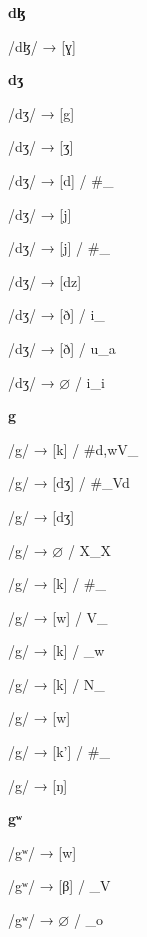 \begin{center}\textbf{dɮ}\end{center}
\begin{multicols}{4}
\noindent /dɮ/ → [ɣ]

\end{multicols}

\begin{center}\textbf{dʒ}\end{center}
\begin{multicols}{4}
\noindent /dʒ/ → [g]

\noindent /dʒ/ → [ʒ]

\noindent /dʒ/ → [d] / \#\_

\noindent /dʒ/ → [j]

\noindent /dʒ/ → [j] / \#\_

\noindent /dʒ/ → [dz]

\noindent /dʒ/ → [ð] / i\_

\noindent /dʒ/ → [ð] / u\_a

\noindent /dʒ/ → $\varnothing$ / i\_i

\end{multicols}

\begin{center}\textbf{g}\end{center}
\begin{multicols}{4}
\noindent /g/ → [k] / \#{d,w}V\_

\noindent /g/ → [dʒ] / \#\_Vd

\noindent /g/ → [dʒ]

\noindent /g/ → $\varnothing$ / X\_X

\noindent /g/ → [k] / \#\_

\noindent /g/ → [w] / V\_

\noindent /g/ → [k] / \_w

\noindent /g/ → [k] / N\_

\noindent /g/ → [w]

\noindent /g/ → [k'] / \#\_

\noindent /g/ → [ŋ]

\end{multicols}

\begin{center}\textbf{gʷ}\end{center}
\begin{multicols}{4}
\noindent /gʷ/ → [w]

\noindent /gʷ/ → [β] / \_V

\noindent /gʷ/ → $\varnothing$ / \_o

\end{multicols}

